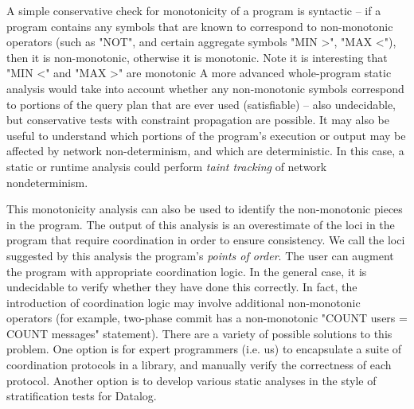 A simple conservative check for monotonicity of a program is syntactic -- if a
program contains any symbols that are known to correspond to non-monotonic
operators (such as "NOT", and certain aggregate symbols "MIN >", "MAX <"), then
it is non-monotonic, otherwise it is monotonic.  Note it is interesting that
"MIN <" and "MAX >" are monotonic   A more advanced
whole-program static analysis would take into account whether any non-monotonic
symbols correspond to portions of the query plan that are ever used
(satisfiable) -- also undecidable, but conservative tests with constraint
propagation are possible.  It may also be useful to understand which portions
of the program's execution or output may be affected by network
non-determinism, and which are deterministic.  In this case, a static or
runtime analysis could perform {\em taint tracking} of network nondeterminism.

This monotonicity analysis can also be used to identify the non-monotonic
pieces in the program.  The output of this analysis is an overestimate of the
loci in the program that require coordination in order to ensure consistency.
We call the loci suggested by this analysis the program's {\em points of
order}.  The user can augment the program with appropriate coordination logic.
In the general case, it is undecidable to verify whether they have done this
correctly.  In fact, the introduction of coordination logic may involve
additional non-monotonic operators (for example, two-phase commit has a
non-monotonic "COUNT users = COUNT messages" statement).  There are a variety
of possible solutions to this problem.  One option is for expert programmers
(i.e. us) to encapsulate a suite of coordination protocols in a library, and
manually verify the correctness of each protocol.  Another option is to develop
various static analyses in the style of stratification tests for Datalog.

